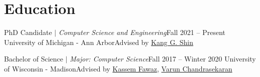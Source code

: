 \section{Education}
  \CVSubHeadingListStart
    \CVSubheading
      {{PhD Candidate $|$ \emph{\small{Computer Science and Engineering}}}}{Fall 2021 -- Present}
      {University of Michigan - Ann Arbor}{Advised by \href{https://web.eecs.umich.edu/~kgshin/}{Kang G. Shin}}

    \CVSubheading
      {{Bachelor of Science $|$ \emph{\small{Major: Computer Science}}}}{Fall 2017 -- Winter 2020}
      {University of Wisconsin - Madison}{Advised by \href{https://kassemfawaz.com/}{Kassem Fawaz}, \href{https://pages.cs.wisc.edu/~chandrasekaran/}{Varun Chandrasekaran}}
  \CVSubHeadingListEnd